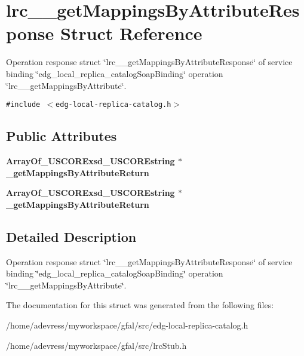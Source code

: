 \section{lrc\_\-\_\-get\-Mappings\-By\-Attribute\-Response Struct Reference}
\label{structlrc____getMappingsByAttributeResponse}
Operation response struct \char`\"{}lrc\_\-\_\-get\-Mappings\-By\-Attribute\-Response\char`\"{} of service binding \char`\"{}edg\_\-local\_\-replica\_\-catalog\-Soap\-Binding\char`\"{} operation \char`\"{}lrc\_\-\_\-get\-Mappings\-By\-Attribute\char`\"{}.  


{\tt \#include $<$edg-local-replica-catalog.h$>$}

\subsection*{Public Attributes}
\begin{CompactItemize}
\item 
\bf{Array\-Of\_\-USCORExsd\_\-USCOREstring} $\ast$ \textbf{\_\-get\-Mappings\-By\-Attribute\-Return}\label{structlrc____getMappingsByAttributeResponse_d7aeb8bfd812968d61a0725f56a69b2c}

\item 
\bf{Array\-Of\_\-USCORExsd\_\-USCOREstring} $\ast$ \textbf{\_\-get\-Mappings\-By\-Attribute\-Return}\label{structlrc____getMappingsByAttributeResponse_d7aeb8bfd812968d61a0725f56a69b2c}

\end{CompactItemize}


\subsection{Detailed Description}
Operation response struct \char`\"{}lrc\_\-\_\-get\-Mappings\-By\-Attribute\-Response\char`\"{} of service binding \char`\"{}edg\_\-local\_\-replica\_\-catalog\-Soap\-Binding\char`\"{} operation \char`\"{}lrc\_\-\_\-get\-Mappings\-By\-Attribute\char`\"{}. 



The documentation for this struct was generated from the following files:\begin{CompactItemize}
\item 
/home/adevress/myworkspace/gfal/src/edg-local-replica-catalog.h\item 
/home/adevress/myworkspace/gfal/src/lrc\-Stub.h\end{CompactItemize}
